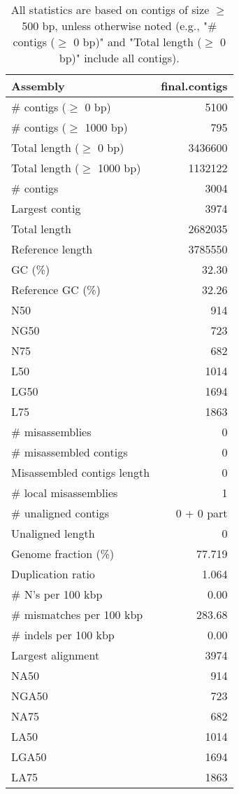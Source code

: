 \documentclass[12pt,a4paper]{article}
\begin{document}
\begin{table}[ht]
\begin{center}
\caption{All statistics are based on contigs of size $\geq$ 500 bp, unless otherwise noted (e.g., "\# contigs ($\geq$ 0 bp)" and "Total length ($\geq$ 0 bp)" include all contigs).}
\begin{tabular}{|l*{1}{|r}|}
\hline
Assembly & final.contigs \\ \hline
\# contigs ($\geq$ 0 bp) & 5100 \\ \hline
\# contigs ($\geq$ 1000 bp) & 795 \\ \hline
Total length ($\geq$ 0 bp) & 3436600 \\ \hline
Total length ($\geq$ 1000 bp) & 1132122 \\ \hline
\# contigs & 3004 \\ \hline
Largest contig & 3974 \\ \hline
Total length & 2682035 \\ \hline
Reference length & 3785550 \\ \hline
GC (\%) & 32.30 \\ \hline
Reference GC (\%) & 32.26 \\ \hline
N50 & 914 \\ \hline
NG50 & 723 \\ \hline
N75 & 682 \\ \hline
L50 & 1014 \\ \hline
LG50 & 1694 \\ \hline
L75 & 1863 \\ \hline
\# misassemblies & 0 \\ \hline
\# misassembled contigs & 0 \\ \hline
Misassembled contigs length & 0 \\ \hline
\# local misassemblies & 1 \\ \hline
\# unaligned contigs & 0 + 0 part \\ \hline
Unaligned length & 0 \\ \hline
Genome fraction (\%) & 77.719 \\ \hline
Duplication ratio & 1.064 \\ \hline
\# N's per 100 kbp & 0.00 \\ \hline
\# mismatches per 100 kbp & 283.68 \\ \hline
\# indels per 100 kbp & 0.00 \\ \hline
Largest alignment & 3974 \\ \hline
NA50 & 914 \\ \hline
NGA50 & 723 \\ \hline
NA75 & 682 \\ \hline
LA50 & 1014 \\ \hline
LGA50 & 1694 \\ \hline
LA75 & 1863 \\ \hline
\end{tabular}
\end{center}
\end{table}
\end{document}
